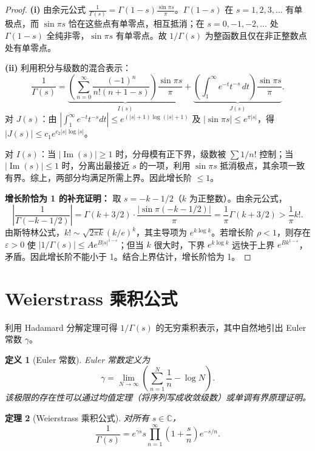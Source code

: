 \documentclass[UTF8]{ctexart}
\newtheorem{theorem}{定理}[section]
\newtheorem{definition}[theorem]{定义}
\numberwithin{equation}{section}
\newcommand{\CC}{\mathbb{C}}
\begin{document}
\begin{proof}
\textbf{(i)} 由余元公式 \(\displaystyle\frac{1}{\Gamma(s)}=\Gamma(1-s)\frac{\sin\pi s}{\pi}\)。\(\Gamma(1-s)\) 在 \(s=1,2,3,\dots\) 有单极点，而 \(\sin\pi s\) 恰在这些点有单零点，相互抵消；在 \(s=0,-1,-2,\dots\) 处 \(\Gamma(1-s)\) 全纯非零，\(\sin\pi s\) 有单零点。故 \(1/\Gamma(s)\) 为整函数且仅在非正整数点处有单零点。

\textbf{(ii)} 利用积分与级数的混合表示：
\[
\frac{1}{\Gamma(s)}= \underbrace{\left(\sum_{n=0}^{\infty}\frac{(-1)^{n}}{n!(n+1-s)}\right)\frac{\sin\pi s}{\pi}}_{I(s)}
+\underbrace{\left(\int_{1}^{\infty} e^{-t}t^{-s}\, dt\right)\frac{\sin\pi s}{\pi}}_{J(s)}.
\]
对 \(J(s)\)：由 \(|\int_{1}^{\infty} e^{-t}t^{-s}dt|\le e^{(|s|+1)\log(|s|+1)}\) 及 \(|\sin\pi s|\le e^{\pi|s|}\)，得 \(|J(s)|\le c_{1} e^{c_{2}|s|\log|s|}\)。

对 \(I(s)\)：当 \(|\operatorname{Im}(s)|\ge1\) 时，分母模有正下界，级数被 \(\sum 1/n!\) 控制；当 \(|\operatorname{Im}(s)|\le1\) 时，分离出最接近 \(s\) 的一项，利用 \(\sin\pi s\) 抵消极点，其余项一致有界。综上，两部分均满足所需上界。因此增长阶 \(\le1\)。

\noindent\textbf{增长阶恰为 1 的补充证明：}
取 \(s=-k-1/2\)（\(k\) 为正整数）。由余元公式，
\[
\left|\frac{1}{\Gamma(-k-1/2)}\right|
= \Gamma(k+3/2)\cdot\frac{|\sin\pi(-k-1/2)|}{\pi}
= \frac{1}{\pi}\Gamma(k+3/2) > \frac{1}{\pi} k!.
\]
由斯特林公式，\(k! \sim \sqrt{2\pi k}(k/e)^{k}\)，其主导项为 \(e^{k\log k}\)。若增长阶 \(\rho<1\)，则存在 \(\varepsilon>0\) 使 \(|1/\Gamma(s)|\le A e^{B|s|^{1-\varepsilon}}\)；但当 \(k\) 很大时，下界 \(e^{k\log k}\) 远快于上界 \(e^{B k^{1-\varepsilon}}\)，矛盾。因此增长阶不能小于 1。结合上界估计，增长阶恰为 1。
\end{proof}

\section{Weierstrass 乘积公式}

利用 Hadamard 分解定理可得 \(1/\Gamma(s)\) 的无穷乘积表示，其中自然地引出 Euler 常数 \(\gamma\)。

\begin{definition}[Euler 常数]
Euler 常数定义为
\[
\gamma = \lim_{N\to\infty}\left(\sum_{n=1}^{N}\frac{1}{n} - \log N\right).
\]
该极限的存在性可以通过均值定理（将序列写成收敛级数）或单调有界原理证明。
\end{definition}

\begin{theorem}[Weierstrass 乘积公式]\label{thm:ProdFormula}
对所有 \(s\in\CC\)，
\[
\frac{1}{\Gamma(s)} = e^{\gamma s} s \prod_{n=1}^{\infty} \left(1+\frac{s}{n}\right) e^{-s/n}.
\]
\end{theorem}
\end{document}
